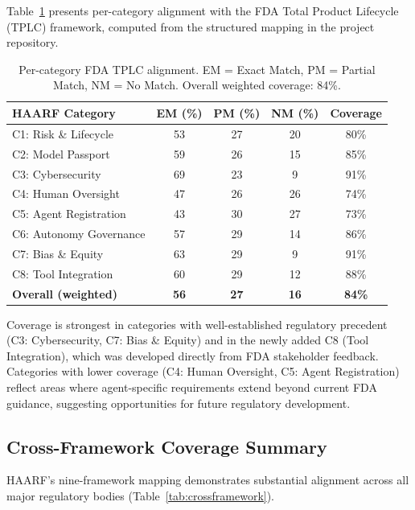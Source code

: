 \documentclass[11pt]{article}
\begin{document}
Table~\ref{tab:fda_percategory} presents per-category alignment with the FDA Total Product Lifecycle (TPLC) framework, computed from the structured mapping in the project repository.

\begin{table}[H]
\centering
\footnotesize
\caption{Per-category FDA TPLC alignment. EM = Exact Match, PM = Partial Match, NM = No Match. Overall weighted coverage: 84\%.}
\label{tab:fda_percategory}
\begin{tabular}{|l|c|c|c|c|}
\hline
\textbf{HAARF Category} & \textbf{EM (\%)} & \textbf{PM (\%)} & \textbf{NM (\%)} & \textbf{Coverage} \\
\hline
C1: Risk \& Lifecycle      & 53 & 27 & 20 & 80\% \\
C2: Model Passport          & 59 & 26 & 15 & 85\% \\
C3: Cybersecurity            & 69 & 23 &  9 & 91\% \\
C4: Human Oversight          & 47 & 26 & 26 & 74\% \\
C5: Agent Registration       & 43 & 30 & 27 & 73\% \\
C6: Autonomy Governance      & 57 & 29 & 14 & 86\% \\
C7: Bias \& Equity           & 63 & 29 &  9 & 91\% \\
C8: Tool Integration         & 60 & 29 & 12 & 88\% \\
\hline
\textbf{Overall (weighted)}  & \textbf{56} & \textbf{27} & \textbf{16} & \textbf{84\%} \\
\hline
\end{tabular}
\end{table}

Coverage is strongest in categories with well-established regulatory precedent (C3: Cybersecurity, C7: Bias \& Equity) and in the newly added C8 (Tool Integration), which was developed directly from FDA stakeholder feedback. Categories with lower coverage (C4: Human Oversight, C5: Agent Registration) reflect areas where agent-specific requirements extend beyond current FDA guidance, suggesting opportunities for future regulatory development.

\subsection{Cross-Framework Coverage Summary}

HAARF's nine-framework mapping demonstrates substantial alignment across all major regulatory bodies (Table~\ref{tab:crossframework}).
\end{document}
